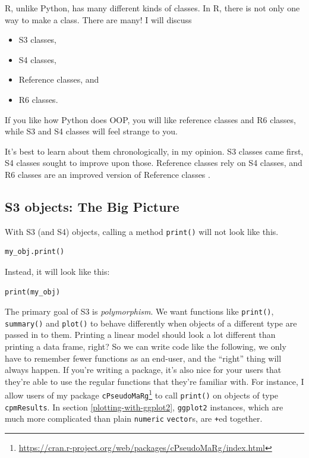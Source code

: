 \documentclass[
  12pt,
  krantz2]{krantz}
\providecommand{\tightlist}{%
  \setlength{\itemsep}{0pt}\setlength{\parskip}{0pt}}
\renewcommand{\href}[2]{#2\footnote{\url{#1}}}
\begin{document}
R, unlike Python, has many different kinds of classes. In R, there is not only one way to make a class. There are many! I will discuss

\begin{itemize}
\tightlist
\item
  S3 classes,
\item
  S4 classes,
\item
  Reference classes, and
\item
  R6 classes.
\end{itemize}

If you like how Python does OOP, you will like reference classes and R6 classes, while S3 and S4 classes will feel strange to you.

It's best to learn about them chronologically, in my opinion. S3 classes came first, S4 classes sought to improve upon those. Reference classes rely on S4 classes, and R6 classes are an improved version of Reference classes \citep{wickham2014advanced}.

\hypertarget{s3-objects-the-big-picture}{%
\subsection{S3 objects: The Big Picture}\label{s3-objects-the-big-picture}}

With S3 (and S4) objects, calling a method \texttt{print()} will not look like this.

\begin{verbatim}
my_obj.print()
\end{verbatim}

Instead, it will look like this:

\begin{verbatim}
print(my_obj)
\end{verbatim}

The primary goal of S3 is \emph{polymorphism}. We want functions like \texttt{print()}, \texttt{summary()} and \texttt{plot()} to behave differently when objects of a different type are passed in to them. Printing a linear model should look a lot different than printing a data frame, right? So we can write code like the following, we only have to remember fewer functions as an end-user, and the ``right'' thing will always happen. If you're writing a package, it's also nice for your users that they're able to use the regular functions that they're familiar with. For instance, I allow users of my package \href{https://cran.r-project.org/web/packages/cPseudoMaRg/index.html}{\texttt{cPseudoMaRg}} \citep{cpm} to call \texttt{print()} on objects of type \texttt{cpmResults}. In section \ref{plotting-with-ggplot2}, \texttt{ggplot2} instances, which are much more complicated than plain \texttt{numeric} \texttt{vector}s, are \texttt{+}ed together.
\end{document}
